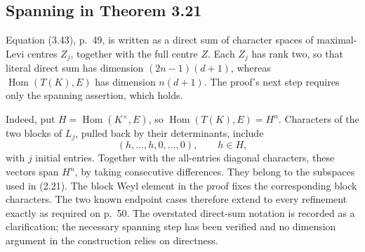 \documentclass[10pt]{article}
\begin{document}
\subsection*{Spanning in Theorem 3.21}
Equation (3.43), p. 49, is written as a direct sum of character spaces of maximal-Levi centres \(Z_j\), together with the full centre \(Z\). Each \(Z_j\) has rank two, so that literal direct sum has dimension \((2n-1)(d+1)\), whereas \(\operatorname{Hom}(T(K),E)\) has dimension \(n(d+1)\). The proof’s next step requires only the spanning assertion, which holds.\par
Indeed, put \(H=\operatorname{Hom}(K^\times,E)\), so \(\operatorname{Hom}(T(K),E)=H^n\). Characters of the two blocks of \(L_j\), pulled back by their determinants, include \[(h,\ldots,h,0,\ldots,0),\qquad h\in H,\] with \(j\) initial entries. Together with the all-entries diagonal characters, these vectors span \(H^n\), by taking consecutive differences. They belong to the subspaces used in (2.21). The block Weyl element in the proof fixes the corresponding block characters. The two known endpoint cases therefore extend to every refinement exactly as required on p. 50. The overstated direct-sum notation is recorded as a clarification; the necessary spanning step has been verified and no dimension argument in the construction relies on directness.\par
\end{document}
